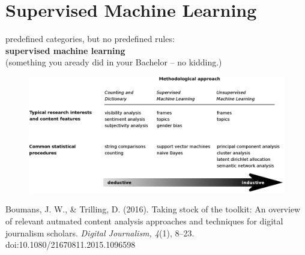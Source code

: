 \documentclass{beamer}
\begin{document}
\section{Supervised Machine Learning}

\begin{frame}[plain]
	predefined categories, but no predefined rules:\\ \textbf{supervised machine learning}\\
	\vspace{1cm}\hspace{1cm} \onslide<2> \footnotesize{(something you aready did in your Bachelor -- no kidding.)}
\end{frame}





\begin{frame}[plain]
	\begin{figure}
		\centering
		\includegraphics[width=1.0\linewidth]{boumanstrilling2016}
		\label{fig:boumanstrilling2016}
	\end{figure}
	\tiny{Boumans, J. W., \& Trilling, D. (2016). Taking stock of the toolkit: An overview of relevant autmated content analysis approaches and techniques for digital journalism scholars. \emph{Digital Journalism, 4}(1), 8–23. doi:10.1080/21670811.2015.1096598}
\end{frame}



		
\end{document}
